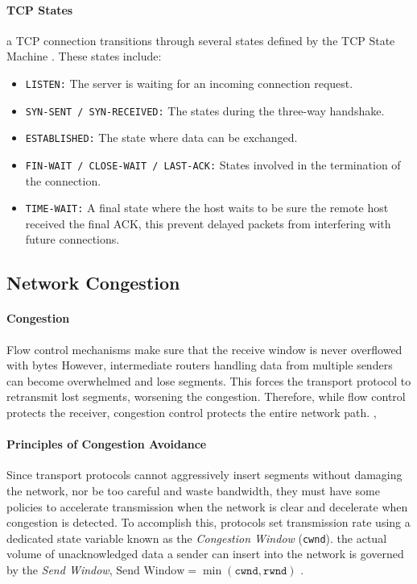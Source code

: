 \documentclass[12pt,a4paper]{article}
\begin{document}
\paragraph{TCP States}
a TCP connection transitions through several states defined by the TCP State Machine \cite[p.~756]{forouzan2013}. These states include:
\begin{itemize}
    \item \texttt{LISTEN:} The server is waiting for an incoming connection request.
    \item \texttt{SYN-SENT / SYN-RECEIVED:} The  states during the three-way handshake.
    \item \texttt{ESTABLISHED:} The state where data can be exchanged.
    \item \texttt{FIN-WAIT / CLOSE-WAIT / LAST-ACK:} States involved in the termination of the connection.
    \item \texttt{TIME-WAIT:} A final state where the host waits to be sure the remote host received the final ACK, this prevent delayed packets from interfering with future connections.
\end{itemize}


\subsection{Network Congestion} \label{subsec:congestion_control}

\paragraph{Congestion}
Flow control mechanisms make sure that the receive window is never overflowed with bytes However, intermediate routers handling data from multiple senders can become overwhelmed and lose segments. This  forces the transport protocol to retransmit lost segments, worsening the congestion. Therefore, while flow control protects the receiver, congestion control protects the entire network path. \cite{forouzan2013},

\paragraph{Principles of Congestion Avoidance}
Since transport protocols cannot aggressively insert segments without damaging the network, nor be too careful and waste bandwidth, they must have some policies to accelerate transmission when the network is clear and decelerate when congestion is detected. To accomplish this, protocols set  transmission rate using a dedicated state variable known as the \textit{Congestion Window} (\texttt{cwnd}). the actual volume of unacknowledged data a sender can insert into the network is  governed by the \textit{Send Window}, $\text{Send Window} = \min(\texttt{cwnd}, \texttt{rwnd})$ \cite[p.~777]{forouzan2013}.
\end{document}
